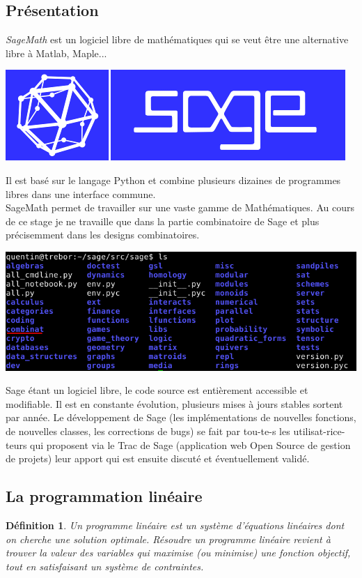 \documentclass[a4paper]{article}
\newtheorem{Def}{Définition}
\begin{document}
\subsection{Présentation}
\textit{SageMath} est un logiciel libre de mathématiques qui se veut être une alternative libre à Matlab, Maple...
\begin{center}
\includegraphics[scale=0.5 ]{sage.png}
\end{center}
Il est basé sur le langage Python et combine plusieurs dizaines de programmes libres dans une interface commune.\\
SageMath permet de travailler sur une vaste gamme de Mathématiques. Au cours de ce stage je ne travaille que dans la partie combinatoire de Sage et plus précisemment dans les designs combinatoires.
\vspace{4\baselineskip}
\begin{center}
  \includegraphics[scale=0.6]{matieres.jpg}
\end{center}
\vspace{4\baselineskip}
Sage étant un logiciel libre, le code source est entièrement accessible et modifiable. Il est en constante évolution, plusieurs mises à jours stables sortent par année. Le développement de Sage (les implémentations de nouvelles fonctions, de nouvelles classes, les corrections de bugs) se fait par tou-te-s les utilisat-rice-teurs qui proposent via le Trac de Sage (application web Open Source de gestion de projets) leur apport qui est ensuite discuté et éventuellement validé.








\newpage
\subsection{La programmation linéaire}
\begin{Def}
  Un programme linéaire est un système d’équations linéaires dont on cherche une solution optimale. Résoudre un programme linéaire revient à trouver la valeur des variables qui maximise (ou minimise) une fonction objectif, tout en satisfaisant un système de contraintes.
\end{Def}
\end{document}
